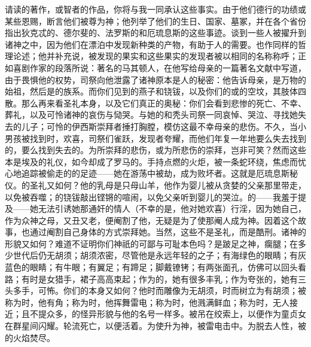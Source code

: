 请读的著作，或智者的作品，你将与我一同承认这些事实。由于他们德行的功绩或某些恩赐，断言他们被尊为神；他列举了他们的生日、国家、墓冢，并在各个省份指出狄克忒的、德尔斐的、法罗斯的和厄琉息斯的这些事迹。谈到一些人被擢升到诸神之中，因为他们在漂泊中发现新种类的产物，有助于人的需要。也作同样的哲理论述；他并补充说，被发现的果实和这些果实的发现者被以相同的名称称呼；正如喜剧作家的段落所说：著名的马其顿人，在他写给母亲的一篇著名文献中写道，由于畏惧他的权势，司祭向他泄露了诸神原本是人的秘密：他告诉母亲，是万物的始祖，然后是的族系。而你们见到的燕子和铙钹，以及你们的或的空坟，其肢体四散。那么再来看圣礼本身，以及它们真正的奥秘：你们会看到悲惨的死亡、不幸、葬礼，以及可怜诸神的哀伤与恸哭。与她的和秃头司祭一同哀悼、哭泣、寻找她失去的儿子；可怜的伊西斯崇拜者捶打胸膛，模仿这最不幸母亲的悲伤。不久，当小男孩被找到时，欢喜，司祭们雀跃，发现者夸耀，而他们年复一年地要么失去找到的，要么找到失去的。为所崇拜的悲伤，或为所悲伤的崇拜，岂非可笑？然而这些本是埃及的礼仪，如今却成了罗马的。手持点燃的火炬，被一条蛇环绕，焦虑而忧心地追踪被偷走的的足迹——她在游荡中被劫，成为败坏者。这就是厄琉息斯秘仪。的圣礼又如何？他的乳母是只母山羊，他作为婴儿被从贪婪的父亲那里带走，以免被吞噬；的铙钹敲出铿锵的喧闹，以免父亲听到婴儿的哭泣。的——我羞于提及——她无法引诱她那通奸的情人（不幸的是，他对她欢喜）行淫，因为她自己，作为众神之母，又丑又老，便阉割了他，无疑是为了使那阉人成为神。因着这个故事，也通过阉割自己身体的方式崇拜她。当然，这些不是圣礼，而是酷刑。诸神的形貌又如何？难道不证明你们神祇的可鄙与可耻本色吗？是跛足之神，瘸腿；在多少世代后仍无胡须；胡须浓密，尽管他是永远年轻的之子；有海绿色的眼睛；有灰蓝色的眼睛；有牛眼；有翼足；有蹄足；脚戴镣铐；有两张面孔，仿佛可以回头看路；有时是女猎手，裙子高高束起；作为的，她有很多丰乳；作为夸张的，她有三头多手，可怖。你们的本身又如何？他时而雕像为无胡须，时而树立为有胡须；被称为时，他有角；称为时，他挥舞雷电；称为时，他溅满鲜血；称为时，无人接近；且不提众多，的怪异形貌与他的名号一样多。被吊在绞索上，以便作为童贞女在群星间闪耀。轮流死亡，以便活着。为使升为神，被雷电击中。为脱去人性，被的火焰焚尽。\par

